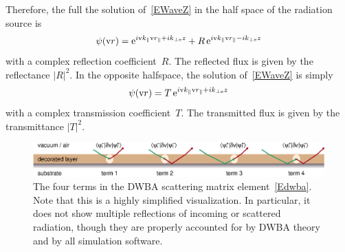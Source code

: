 Therefore, the full the solution of~\cref{EWaveZ} in the half space
of the radiation source is
\begin{equation}\label{Eref1}
  \psi(\text{v}{r}) = \mathrm e^{i\text{v}{k}_\parallel\text{v}{r}_\parallel+ik_{\perp\text{e}} z} +
      R\, \mathrm e^{i\text{v}{k}_\parallel\text{v}{r}_\parallel-ik_{\perp\text{e}} z}
\end{equation}
with a complex reflection coefficient~$R$.
%
The reflected flux is given by the re\-flect\-an\-ce $|R|^2$.
%
%
In the opposite halfspace, the solution of~\cref{EWaveZ} is simply
\begin{equation}\label{Etra1}
  \psi(\text{v}{r}) = T\, \mathrm e^{i\text{v}{k}_\parallel\text{v}{r}_\parallel+ik_{\perp\text{e}} z}
\end{equation}
with a complex transmission coefficient~$T$.
The transmitted flux is given by the transmittance $|T|^2$.
%
%

\begin{figure}[tb]
\begin{center}
\includegraphics[width=1\textwidth]{fig/drawing/dwba_4terms.ps}
\end{center}
\caption{The four terms in the DWBA scattering matrix element~\cref{Edwba}.
Note that this is a highly simplified visualization.
In particular, it does not show multiple reflections
%
%
of incoming or scattered radiation,
though they are properly accounted for by DWBA theory and by all simulation software.}
\label{Fdwba4terms}
\end{figure}

